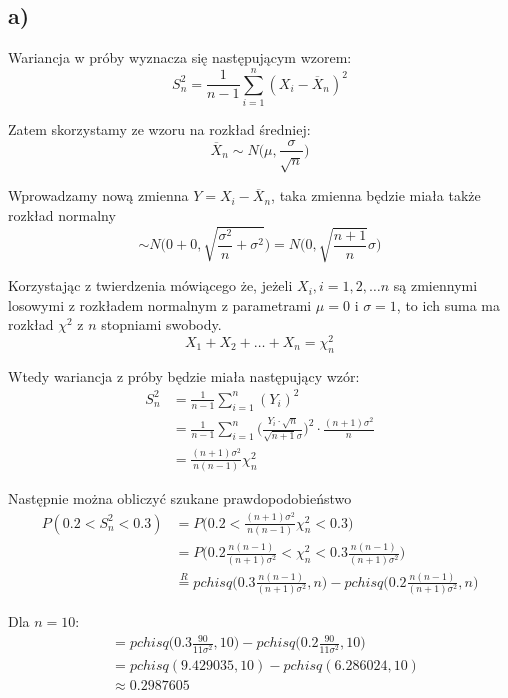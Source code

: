 \documentclass{article}
\begin{document}

\subsection*{a)}
Wariancja w próby wyznacza się następującym wzorem:
$$S_n^2 = \frac{1}{n-1} \sum_{i=1}^{n}(X_i - \overline{X}_n)^2$$

Zatem skorzystamy ze wzoru na rozkład średniej:
$$\overline{X}_n \sim N\Big( \mu, \frac{\sigma}{\sqrt{n}} \Big)$$

Wprowadzamy nową zmienna $Y = X_i - \overline{X}_n$, taka zmienna będzie miała także rozkład normalny
$$\sim N\Big( 0+0, \sqrt{\frac{\sigma^2}{n}+\sigma^2}\Big) = N\Big( 0, \sqrt{\frac{n+1}{n}}\sigma \Big)$$

Korzystając z twierdzenia mówiącego że, jeżeli $X_i, i=1,2,\dots n$ są zmiennymi losowymi z rozkładem normalnym z parametrami $\mu = 0$ i $\sigma=1$, to ich suma ma rozkład $\chi^2$ z $n$ stopniami swobody.
$$ X_1+X_2+\dots+X_n = \chi_n^2$$

Wtedy wariancja z próby będzie miała następujący wzór:
\begin{align*}
S_n^2 & = \frac{1}{n-1} \sum_{i=1}^{n}(Y_i)^2 \\
& = \frac{1}{n-1} \sum_{i=1}^{n} \Big( \frac{Y_i\cdot\sqrt{n}}{\sqrt{n+1}\sigma} \Big)^2 \cdot \frac{(n+1)\sigma^2}{n} \\
& = \frac{(n+1)\sigma^2}{n(n-1)} \chi_n^2
\end{align*}

Następnie można obliczyć szukane prawdopodobieństwo
\begin{align*}
P(0.2 < S_n^2 < 0.3) & = P\Big( 0.2 < \frac{(n+1)\sigma^2}{n(n-1)} \chi_n^2 < 0.3 \Big) \\
& = P \Big( 0.2\frac{n(n-1)}{(n+1)\sigma^2} < \chi_n^2 < 0.3\frac{n(n-1)}{(n+1)\sigma^2} \Big) \\
& \overset{R}{=} pchisq\Big( 0.3\frac{n(n-1)}{(n+1)\sigma^2},n \Big) - pchisq\Big( 0.2\frac{n(n-1)}{(n+1)\sigma^2},n \Big)
\end{align*}

Dla $n=10$:
\begin{align*}
& = pchisq\Big( 0.3\frac{90}{11\sigma^2},10 \Big) - pchisq\Big( 0.2\frac{90}{11\sigma^2},10 \Big) \\
& = pchisq(9.429035,10) - pchisq(6.286024,10) \\
& \approx 0.2987605
\end{align*}
\end{document}
